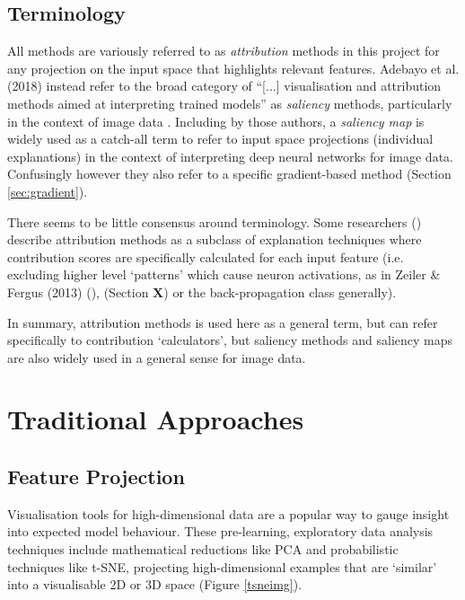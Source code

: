 \documentclass[main]{subfiles}
\begin{document}
\subsection*{Terminology}
All methods are variously referred to as \textit{attribution} methods in this project for any projection on the input space that highlights relevant features. Adebayo et al. (2018) instead refer to the broad category of ``[...] visualisation and attribution methods aimed at interpreting trained models'' as \textit{saliency} methods, particularly in the context of image data \cite{sanity}. Including by those authors, a \textit{saliency map} is widely used as a catch-all term to refer to input space projections (individual explanations) in the context of interpreting deep neural networks for image data. Confusingly however they also refer to a specific gradient-based method (Section \ref{sec:gradient}). 

There seems to be little consensus around terminology. Some researchers (\cite{patternnet}) describe attribution methods as a subclass of explanation techniques where contribution scores are specifically calculated for each input feature (i.e. excluding higher level `patterns' which cause neuron activations, as in Zeiler \& Fergus (2013) (\cite{zeilerfergus2013}), (Section \textbf{X}) or the back-propagation class generally). 

In summary, attribution methods is used here as a general term, but can refer specifically to contribution `calculators', but saliency methods and saliency maps are also widely used in a general sense for image data.


\section{Traditional Approaches}

\subsection{Feature Projection}
Visualisation tools for high-dimensional data are a popular way to gauge insight into expected model behaviour.  These pre-learning, exploratory data analysis techniques include mathematical reductions like PCA and probabilistic techniques like t-SNE,  projecting high-dimensional examples that are `similar' into a visualisable 2D or 3D space \cite{tsnepaper} (Figure \ref{tsneimg}).
\end{document}
